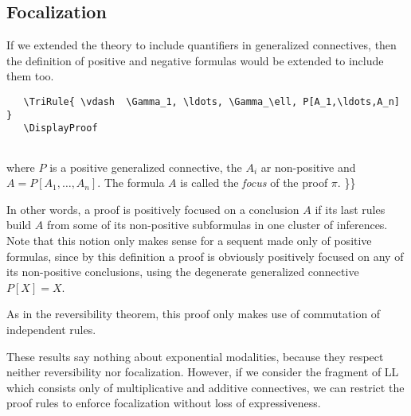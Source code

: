 \subsection{Focalization}\label{focalization}

If we extended the theory to include quantifiers in generalized
connectives, then the definition of positive and negative formulas would
be extended to include them too.

\texttt{~~~\textbackslash{}TriRule\{~\textbackslash{}vdash~~\textbackslash{}Gamma\_1,~\textbackslash{}ldots,~\textbackslash{}Gamma\_\textbackslash{}ell,~P{[}A\_1,\textbackslash{}ldots,A\_n{]}~\}}\\
\texttt{~~~\textbackslash{}DisplayProof}\\
\texttt{~}

where \(P\) is a positive generalized connective, the \(A_i\) ar
non-positive and \(A=P[A_1,\ldots,A_n]\). The formula \(A\) is called
the \emph{focus} of the proof \(\pi\). \}\}

In other words, a proof is positively focused on a conclusion \(A\) if
its last rules build \(A\) from some of its non-positive subformulas in
one cluster of inferences. Note that this notion only makes sense for a
sequent made only of positive formulas, since by this definition a proof
is obviously positively focused on any of its non-positive conclusions,
using the degenerate generalized connective \(P[X]=X\).

As in the reversibility theorem, this proof only makes use of
commutation of independent rules.

These results say nothing about exponential modalities, because they
respect neither reversibility nor focalization. However, if we consider
the fragment of LL which consists only of multiplicative and additive
connectives, we can restrict the proof rules to enforce focalization
without loss of expressiveness.

